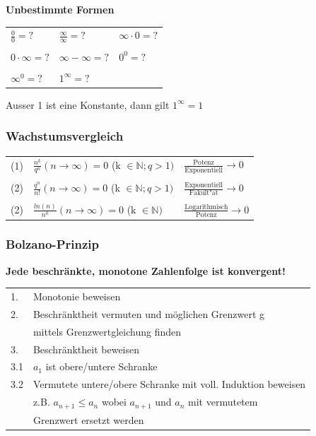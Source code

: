 			\textbf{Unbestimmte Formen} \\
				\begin{tabular}{lll}
					$\frac{0}{0} = ?$    & $\frac{\infty}{\infty} = ?$ & $\infty \cdot 0 = ?$ \\
					\\
					$0 \cdot \infty = ?$ & $\infty - \infty = ?$       & $0^0 = ?$ \\
					\\
					$\infty^0 = ?$       & $1^{\infty} = ?$            & \\
				\end{tabular}
			
				Ausser 1 ist eine Konstante, dann gilt $1^{\infty} = 1 $ \\
				
		\subsubsection{Wachstumsvergleich} 
			\begin{tabular}{lll}
				(1) & $\frac{n^k}{q^n} (n \rightarrow \infty)= 0$  (k $\in \mathbb{N}; q > 1)$ & $\frac{\text{Potenz}}{\text{Exponentiell}} \rightarrow 0$\\
				\\
				(2) & $\frac{q^n}{n!} (n \rightarrow \infty)= 0$  (k $\in \mathbb{N}; q > 1)$  & $\frac{\text{Exponentiell}}{\text{Fakult"at}} \rightarrow 0$ \\
				\\
				(2) & $\frac{ln(n)}{n^k} (n \rightarrow \infty)= 0$  (k $\in \mathbb{N})$      & $\frac{\text{Logarithmisch}}{\text{Potenz}} \rightarrow 0$ \\
			\end{tabular}						
				
		\subsubsection{Bolzano-Prinzip}
			\textbf{Jede beschränkte, monotone Zahlenfolge ist konvergent!} \\
				\begin{tabular}{ll}
					1. & Monotonie beweisen \\
					2. &  Beschränktheit vermuten und möglichen Grenzwert g \\ 
					   & mittels Grenzwertgleichung finden  \\
					3. & Beschränktheit beweisen \\
					3.1 & $a_1$ ist obere/untere Schranke \\
					3.2 & Vermutete untere/obere Schranke mit voll. Induktion beweisen \\
					    & z.B. $a_{n+1} \leq a_n$ wobei $a_{n+1}$ und $a_n$ mit vermutetem \\
					    & Grenzwert ersetzt werden \\
				\end{tabular}
			
